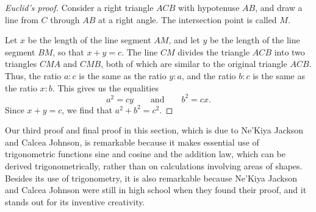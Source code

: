 \begin{proof}[Euclid's proof]
  Consider a right triangle $ACB$ with hypotenuse $AB$, and draw a line from $C$ through $AB$ at a right angle. The intersection point is called $M$.
  \begin{figure}[H]
    \centering
  \end{figure}
  Let $x$ be the length of the line segment $AM$, and let $y$ be the length of the line segment $BM$, so that $x+y=c$. The line $CM$ divides the triangle $ACB$ into two triangles $CMA$ and $CMB$, both of which are similar to the original triangle $ACB$. Thus, the ratio $a:c$ is the same as the ratio $y:a$, and the ratio $b:c$ is the same as the ratio $x:b$. This gives us the equalities
  \begin{equation*}
    a^2 = cy\qquad\text{and}\qquad b^2 = cx.
  \end{equation*}
  Since $x+y=c$, we find that $a^2+b^2=c^2$.
\end{proof}

Our third proof and final proof in this section, which is due to Ne'Kiya Jackson and Calcea Johnson, is remarkable because it makes essential use of trigonometric functions sine and cosine and the addition law, which can be derived trigonometrically, rather than on calculations involving areas of shapes. Besides its use of trigonometry, it is also remarkable because Ne'Kiya Jackson and Calcea Johnson were still in high school when they found their proof, and it stands out for its inventive creativity.

